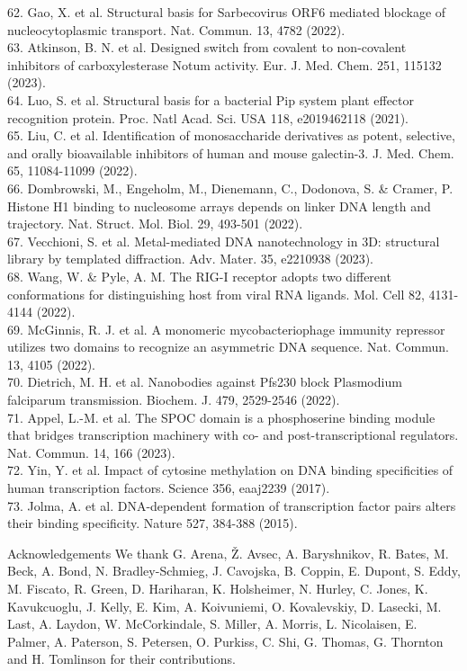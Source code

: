 \documentclass[10pt]{article}
\begin{document}
62. Gao, X. et al. Structural basis for Sarbecovirus ORF6 mediated blockage of nucleocytoplasmic transport. Nat. Commun. 13, 4782 (2022).\\
63. Atkinson, B. N. et al. Designed switch from covalent to non-covalent inhibitors of carboxylesterase Notum activity. Eur. J. Med. Chem. 251, 115132 (2023).\\
64. Luo, S. et al. Structural basis for a bacterial Pip system plant effector recognition protein. Proc. Natl Acad. Sci. USA 118, e2019462118 (2021).\\
65. Liu, C. et al. Identification of monosaccharide derivatives as potent, selective, and orally bioavailable inhibitors of human and mouse galectin-3. J. Med. Chem. 65, 11084-11099 (2022).\\
66. Dombrowski, M., Engeholm, M., Dienemann, C., Dodonova, S. \& Cramer, P. Histone H1 binding to nucleosome arrays depends on linker DNA length and trajectory. Nat. Struct. Mol. Biol. 29, 493-501 (2022).\\
67. Vecchioni, S. et al. Metal-mediated DNA nanotechnology in 3D: structural library by templated diffraction. Adv. Mater. 35, e2210938 (2023).\\
68. Wang, W. \& Pyle, A. M. The RIG-I receptor adopts two different conformations for distinguishing host from viral RNA ligands. Mol. Cell 82, 4131-4144 (2022).\\
69. McGinnis, R. J. et al. A monomeric mycobacteriophage immunity repressor utilizes two domains to recognize an asymmetric DNA sequence. Nat. Commun. 13, 4105 (2022).\\
70. Dietrich, M. H. et al. Nanobodies against Pfs230 block Plasmodium falciparum transmission. Biochem. J. 479, 2529-2546 (2022).\\
71. Appel, L.-M. et al. The SPOC domain is a phosphoserine binding module that bridges transcription machinery with co- and post-transcriptional regulators. Nat. Commun. 14, 166 (2023).\\
72. Yin, Y. et al. Impact of cytosine methylation on DNA binding specificities of human transcription factors. Science 356, eaaj2239 (2017).\\
73. Jolma, A. et al. DNA-dependent formation of transcription factor pairs alters their binding specificity. Nature 527, 384-388 (2015).

Acknowledgements We thank G. Arena, Ž. Avsec, A. Baryshnikov, R. Bates, M. Beck, A. Bond, N. Bradley-Schmieg, J. Cavojska, B. Coppin, E. Dupont, S. Eddy, M. Fiscato, R. Green, D. Hariharan, K. Holsheimer, N. Hurley, C. Jones, K. Kavukcuoglu, J. Kelly, E. Kim, A. Koivuniemi, O. Kovalevskiy, D. Lasecki, M. Last, A. Laydon, W. McCorkindale, S. Miller, A. Morris, L. Nicolaisen, E. Palmer, A. Paterson, S. Petersen, O. Purkiss, C. Shi, G. Thomas, G. Thornton and H. Tomlinson for their contributions.
\end{document}

